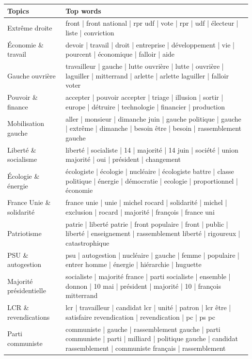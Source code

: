 \documentclass{article}
\begin{document}
\begin{table}[htbp]
\centering
\fontsize{8.5}{10}\selectfont
\begin{tabular}{@{} l p{10cm} @{}}
\toprule
\textbf{Topics} & \textbf{Top words} \\
\midrule
Extrême droite & front | front national | rpr udf | vote | rpr | udf | électeur | liste | conviction \\
Économie \& travail & devoir | travail | droit | entreprise | développement | vie | pourcent | économique | falloir | aide \\
Gauche ouvrière & travailleur | gauche | lutte ouvrière | lutte | ouvrière | laguiller | mitterrand | arlette | arlette laguiller | falloir voter \\
Pouvoir \& finance & accepter | pouvoir accepter | triage | illusion | sortir | europe | détruire | technologie | financier | production \\
Mobilisation gauche & aller | monsieur | dimanche juin | gauche politique | gauche | extrême | dimanche | besoin être | besoin | rassemblement gauche \\
Liberté \& socialisme & liberté | socialiste | 14 | majorité | 14 juin | société | union majorité | oui | président | changement \\
Écologie \& énergie & écologiste | écologie | nucléaire | écologiste battre | classe politique | énergie | démocratie | ecologie | proportionnel | économie \\
France Unie \& solidarité & france unie | unie | michel rocard | solidarité | michel | exclusion | rocard | majorité | françois | france uni \\
Patriotisme & patrie | liberté patrie | front populaire | front | public | liberté | enseignement | rassemblement liberté | rigoureux | catastrophique \\
PSU \& autogestion & psu | autogestion | nucléaire | gauche | femme | populaire | entrer homme | énergie | hiérarchie | huguette \\
Majorité présidentielle & socialiste | majorité france | parti socialiste | ensemble | donnon | 10 mai | président | majorité | 10 | françois mitterrand \\
LCR \& revendications & lcr | travailleur | candidat lcr | unité | patron | lcr être | satisfaire revendication | revendication | pc | ps pc \\
Parti communiste & communiste | gauche | rassemblement gauche | parti communiste | parti | milliard | politique gauche | candidat rassemblement | communiste français | rassemblement \\

\end{tabular}
\end{table}
\end{document}
